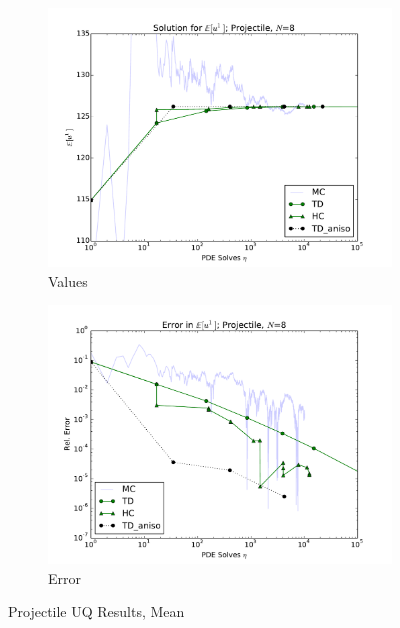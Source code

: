 \documentclass{mc2015}
\begin{document}
\begin{figure}[h]
    \centering
    \begin{subfigure}[b]{0.49 \textwidth}
      \includegraphics[width=\textwidth]{../graphics/projectile_solns_aniso}
      \caption{Values}
      \label{atn vals hdmr}
  \end{subfigure}
\begin{subfigure}[b]{0.49 \textwidth}
\centering
      \includegraphics[width=\textwidth]{../graphics/projectile_errs_aniso}
      \caption{Error}
      \label{atn errs hdmr}
    \end{subfigure}
  \caption{Projectile UQ Results, Mean}
  \label{proj anis mean}
  \end{figure}
\end{document}
